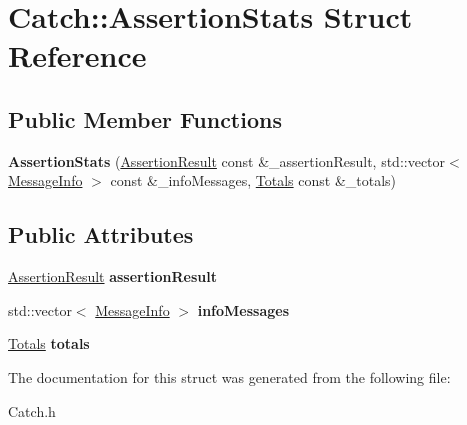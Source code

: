 \hypertarget{struct_catch_1_1_assertion_stats}{\section{Catch\-:\-:Assertion\-Stats Struct Reference}
\label{struct_catch_1_1_assertion_stats}
}
\subsection*{Public Member Functions}
\begin{DoxyCompactItemize}
\item 
\hypertarget{struct_catch_1_1_assertion_stats_a683d4c44ba214b9091cef80f4ee97967}{{\bfseries Assertion\-Stats} (\hyperlink{class_catch_1_1_assertion_result}{Assertion\-Result} const \&\-\_\-assertion\-Result, std\-::vector$<$ \hyperlink{struct_catch_1_1_message_info}{Message\-Info} $>$ const \&\-\_\-info\-Messages, \hyperlink{struct_catch_1_1_totals}{Totals} const \&\-\_\-totals)}\label{struct_catch_1_1_assertion_stats_a683d4c44ba214b9091cef80f4ee97967}

\end{DoxyCompactItemize}
\subsection*{Public Attributes}
\begin{DoxyCompactItemize}
\item 
\hypertarget{struct_catch_1_1_assertion_stats_a9f983a85332251f464efb4efba021b89}{\hyperlink{class_catch_1_1_assertion_result}{Assertion\-Result} {\bfseries assertion\-Result}}\label{struct_catch_1_1_assertion_stats_a9f983a85332251f464efb4efba021b89}

\item 
\hypertarget{struct_catch_1_1_assertion_stats_a12a032fa1f6e0fa8711946625758e6bb}{std\-::vector$<$ \hyperlink{struct_catch_1_1_message_info}{Message\-Info} $>$ {\bfseries info\-Messages}}\label{struct_catch_1_1_assertion_stats_a12a032fa1f6e0fa8711946625758e6bb}

\item 
\hypertarget{struct_catch_1_1_assertion_stats_a1cb537d44b8be3b19663f5fd1c25ce7a}{\hyperlink{struct_catch_1_1_totals}{Totals} {\bfseries totals}}\label{struct_catch_1_1_assertion_stats_a1cb537d44b8be3b19663f5fd1c25ce7a}

\end{DoxyCompactItemize}


The documentation for this struct was generated from the following file\-:\begin{DoxyCompactItemize}
\item 
Catch.\-h\end{DoxyCompactItemize}
